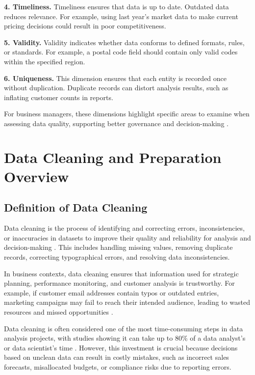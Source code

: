 \textbf{4. Timeliness.} Timeliness ensures that data is up to date. Outdated data reduces relevance. For example, using last year's market data to make current pricing decisions could result in poor competitiveness.

\textbf{5. Validity.} Validity indicates whether data conforms to defined formats, rules, or standards. For example, a postal code field should contain only valid codes within the specified region.

\textbf{6. Uniqueness.} This dimension ensures that each entity is recorded once without duplication. Duplicate records can distort analysis results, such as inflating customer counts in reports.

For business managers, these dimensions highlight specific areas to examine when assessing data quality, supporting better governance and decision-making \cite{caballero2014quality}.


\section{Data Cleaning and Preparation Overview}

\subsection{Definition of Data Cleaning}

Data cleaning is the process of identifying and correcting errors, inconsistencies, or inaccuracies in datasets to improve their quality and reliability for analysis and decision-making \cite{kurgan2006survey}. This includes handling missing values, removing duplicate records, correcting typographical errors, and resolving data inconsistencies.

In business contexts, data cleaning ensures that information used for strategic planning, performance monitoring, and customer analysis is trustworthy. For example, if customer email addresses contain typos or outdated entries, marketing campaigns may fail to reach their intended audience, leading to wasted resources and missed opportunities \cite{rahm2000dataquality}.

Data cleaning is often considered one of the most time-consuming steps in data analysis projects, with studies showing it can take up to 80\% of a data analyst's or data scientist's time \cite{dasu2003exploratory}. However, this investment is crucial because decisions based on unclean data can result in costly mistakes, such as incorrect sales forecasts, misallocated budgets, or compliance risks due to reporting errors.

